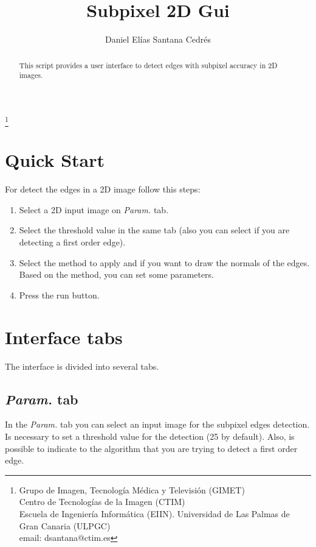 \documentclass{article}
\begin{document}
\title{Subpixel 2D Gui}
\author{Daniel El\'ias Santana Cedr\'es}
\thanks{
Grupo de Imagen, Tecnolog\'ia M\'edica y Televisi\'on (GIMET)\\
Centro de Tecnolog\'ias de la Imagen (CTIM)\\
Escuela de Ingenier\'ia Inform\'atica (EIIN). Universidad de Las Palmas de Gran Canaria (ULPGC)\\
email: dsantana@ctim.es
}


\maketitle

\begin{abstract}
This script provides a user interface to detect edges with subpixel accuracy in 2D images.
\end{abstract}


\section{Quick Start}

For detect the edges in a 2D image follow this steps:
\begin{enumerate}
  \item Select a 2D input image on \emph{Param.} tab.
  \item Select the threshold value in the same tab (also you can select if you are detecting a first order edge).
  \item Select the method to apply and if you want to draw the normals of the edges. Based on the method, you can set some parameters.
  \item Press the run button.
\end{enumerate}

\section{Interface tabs}

The interface is divided into several tabs.

\subsection{\emph{Param.} tab}
In the \emph{Param.} tab you can select an input image for the subpixel edges detection. Is necessary to set a threshold value for the detection (25 by default). Also, is possible to indicate to the algorithm that you are trying to detect a first order edge.
\end{document}
